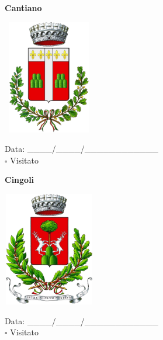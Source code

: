 \documentclass[a5paper,12pt]{article}
\begin{document}
\newpage

\noindent
\begin{minipage}[t]{0.45\textwidth}
    \begin{center}
        \textbf{Cantiano}
    \end{center}
    \vspace{-0.5cm} %
    \begin{center}
        \includegraphics[height= 5cm, width=4cm]{Marche/Stemma Cantiano.png}
    \end{center}
    \vspace{-0.4cm} %
    \begin{flushleft}
        Data: \_\_\_\_/\_\_\_\_/\_\_\_\_\_\_\_\_\_\_\_\_ \\
        $\square$ Visitato
    \end{flushleft}
\end{minipage}
\hfill
\noindent
\begin{minipage}[t]{0.45\textwidth}
    \begin{center}
        \textbf{Cingoli}
    \end{center}
    \vspace{-0.5cm} %
    \begin{center}
        \includegraphics[height= 5cm, width=4cm]{Marche/Stemma Cingoli.png}
    \end{center}
    \vspace{-0.4cm} %
    \begin{flushleft}
        Data: \_\_\_\_/\_\_\_\_/\_\_\_\_\_\_\_\_\_\_\_\_ \\
        $\square$ Visitato
    \end{flushleft}
\end{minipage}
\end{document}
